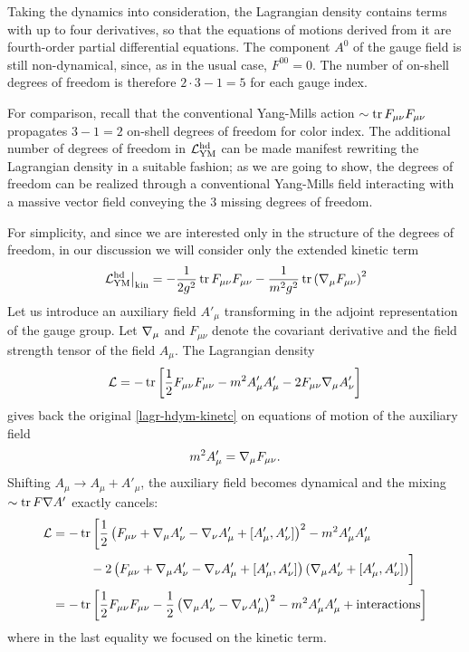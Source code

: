 Taking the dynamics into consideration, the Lagrangian density contains terms with up to four derivatives, so that the equations of motions derived from it are fourth-order partial differential equations.  The component $A^0$  of the gauge field is still non-dynamical, since, as in the usual \ym{} case, $F^{00}=0$.  The number of on-shell degrees of freedom is therefore $ 2 \cdot 3 - 1 = 5 $ for each gauge index.

For comparison, recall that the conventional Yang-Mills action $\sim  \operatorname{tr} F_{\mu\nu}F_{\mu\nu}$ propagates $3 - 1=2$ on-shell degrees of freedom for color index. The additional number of degrees of freedom in ${ \mathcal{L} }_{ \text{YM} }^{ \text{hd} }$ can be made manifest rewriting the Lagrangian density in a suitable fashion; as we are going to show, the degrees of freedom can be realized through a conventional Yang-Mills field interacting with a massive vector field conveying the $3$ missing degrees of freedom.

For simplicity, and since we are interested only in the structure of the degrees of freedom, in our discussion we will consider only the extended kinetic term
\begin{equation}\label{lagr-hdym-kinetc}
\left. \Lagr^\HD_{\YM} \right|_{\text{kin}}
	=
-\frac{1}{2 g^2} \tr  F_{\mu\nu} F_{\mu\nu} %
	- \frac{1}{ m^2 g^2 }
			\tr \left( \covD_\mu F_{\mu\nu} \right)^2
\end{equation}
Let us introduce an auxiliary field $A'_\mu$  transforming in the adjoint representation of the gauge group. Let ${ \mathcal{\nabla} }_\mu$ and $F_{\mu\nu}$ denote the covariant derivative and the field strength tensor of the field $A_\mu$. The Lagrangian density
\begin{equation}
{ \mathcal{L} } =
	-\operatorname{tr} \left[
			\frac{1}{2} F_{\mu\nu} F_{\mu\nu} 
			- m^2 A'_\mu A'_\mu
			- 2 F_{\mu\nu} { \mathcal{\nabla} }_\mu A'_\nu
		\right]
\end{equation}
gives back the original \eqref{lagr-hdym-kinetc} on equations of motion of the auxiliary field 
\begin{equation}
  m^2 A'_\mu = { \mathcal{\nabla} }_\mu F_{\mu\nu} .
\end{equation} Shifting $ A_\mu \rightarrow A_\mu + A'_\mu $, the auxiliary field becomes dynamical and the mixing $\sim \operatorname{tr} F { \mathcal{\nabla} } A'$ exactly cancels:
\begin{equation}\label{lagr-HD-ym-splitted-dof}
\begin{split}
{ \mathcal{L} }
& =
	-\operatorname{tr} \bigg[
			\frac{1}{2} \left(
				F_{\mu\nu} + { \mathcal{\nabla} }_\mu A'_\nu - { \mathcal{\nabla} }_\nu A'_\mu + [A'_\mu,A'_\nu]
				\right)^2 
			- m^2 A'_\mu A'_\mu
\\
&
\hspace{3em}
			- 2 \left(
				F_{\mu\nu} + { \mathcal{\nabla} }_\mu A'_\nu - { \mathcal{\nabla} }_\nu A'_\mu + [A'_\mu,A'_\nu]
				\right)
				({ \mathcal{\nabla} }_\mu  A'_\nu + [A'_\mu,A'_\nu]) 
		\bigg]
\\
& 
	 =
	-\operatorname{tr} \bigg[
		\frac{1}{2}	F_{\mu\nu}F_{\mu\nu} 
		- \frac{1}{2} \left( { \mathcal{\nabla} }_\mu A'_\nu - { \mathcal{\nabla} }_\nu A'_\mu \right)^2 
		- m^2 A'_\mu A'_\mu 
		+ \text{interactions} 
		\bigg]
\end{split}
\end{equation} 
where in the last equality we focused on the kinetic term.




